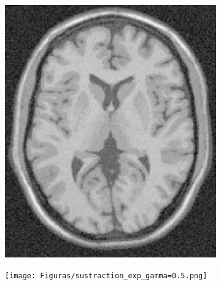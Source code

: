 \documentclass[11pt,twocolumn,twoside]{opticajnl}
\begin{document}
\begin{figure}[h]
\begin{subfigure}[h]{0.24\linewidth}
            \includegraphics[width=\textwidth]{Figuras/ImageA_exp_gamma=0.5.png}
        \end{subfigure}
        \begin{subfigure}[h]{0.24\linewidth}
            \centering
            \texttt{[image: Figuras/sustraction\_exp\_gamma=0.5.png]}
        \end{subfigure}
                \caption{Diferencia entre la imagen original y la imagen transformada con $\gamma = 0.5$.}
                \label{fig:Exptrans0.5_sustraction}
        \begin{subfigure}[h]{0.24\linewidth}
            \centering

\end{subfigure}
\end{figure}
\end{document}
